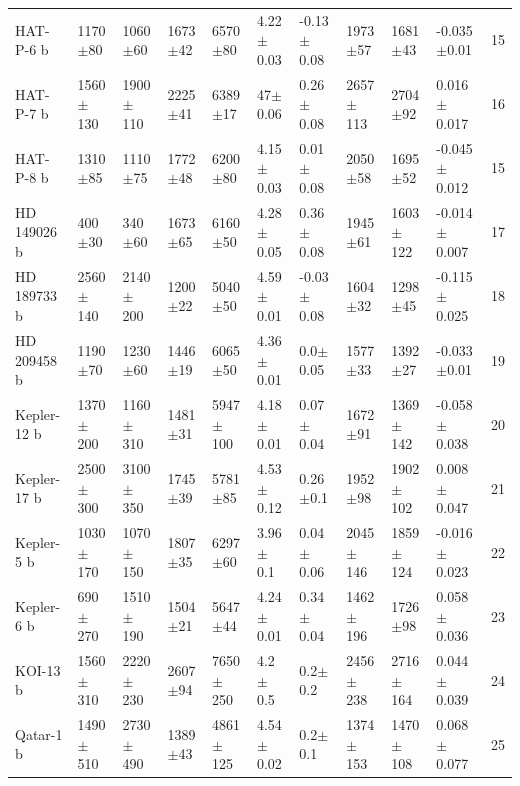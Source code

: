\begin{subappendices}
{\begin{landscape}
\begin{longtable}{lllllllllll}
HAT-P-6 b   &     1170$\pm$80 &     1060$\pm$60 &   1673$\pm$42 &    6570$\pm$80 &  4.22$\pm$0.03 &  -0.13$\pm$0.08 &        1973$\pm$57 &        1681$\pm$43 &   -0.035$\pm$0.01 &        15 \\
HAT-P-7 b   &    1560$\pm$130 &    1900$\pm$110 &   2225$\pm$41 &    6389$\pm$17 &  47$\pm$0.06 &   0.26$\pm$0.08 &       2657$\pm$113 &        2704$\pm$92 &   0.016$\pm$0.017 &   16 \\
HAT-P-8 b   &     1310$\pm$85 &     1110$\pm$75 &   1772$\pm$48 &    6200$\pm$80 &  4.15$\pm$0.03 &   0.01$\pm$0.08 &        2050$\pm$58 &        1695$\pm$52 &  -0.045$\pm$0.012 &        15 \\
HD 149026 b &      400$\pm$30 &      340$\pm$60 &   1673$\pm$65 &    6160$\pm$50 &  4.28$\pm$0.05 &   0.36$\pm$0.08 &        1945$\pm$61 &       1603$\pm$122 &  -0.014$\pm$0.007 &      17 \\
HD 189733 b &    2560$\pm$140 &    2140$\pm$200 &   1200$\pm$22 &    5040$\pm$50 &  4.59$\pm$0.01 &  -0.03$\pm$0.08 &        1604$\pm$32 &        1298$\pm$45 &  -0.115$\pm$0.025 &    18 \\
HD 209458 b &     1190$\pm$70 &     1230$\pm$60 &   1446$\pm$19 &    6065$\pm$50 &  4.36$\pm$0.01 &    0.0$\pm$0.05 &        1577$\pm$33 &        1392$\pm$27 &   -0.033$\pm$0.01 &   19 \\
Kepler-12 b &    1370$\pm$200 &    1160$\pm$310 &   1481$\pm$31 &   5947$\pm$100 &  4.18$\pm$0.01 &   0.07$\pm$0.04 &        1672$\pm$91 &       1369$\pm$142 &  -0.058$\pm$0.038 &        20 \\
Kepler-17 b &    2500$\pm$300 &    3100$\pm$350 &   1745$\pm$39 &    5781$\pm$85 &  4.53$\pm$0.12 &    0.26$\pm$0.1 &        1952$\pm$98 &       1902$\pm$102 &   0.008$\pm$0.047 &        21 \\
Kepler-5 b  &    1030$\pm$170 &    1070$\pm$150 &   1807$\pm$35 &    6297$\pm$60 &   3.96$\pm$0.1 &   0.04$\pm$0.06 &       2045$\pm$146 &       1859$\pm$124 &  -0.016$\pm$0.023 &        22 \\
Kepler-6 b  &     690$\pm$270 &    1510$\pm$190 &   1504$\pm$21 &    5647$\pm$44 &  4.24$\pm$0.01 &   0.34$\pm$0.04 &       1462$\pm$196 &        1726$\pm$98 &   0.058$\pm$0.036 &         23 \\
KOI-13 b    &    1560$\pm$310 &    2220$\pm$230 &   2607$\pm$94 &   7650$\pm$250 &    4.2$\pm$0.5 &     0.2$\pm$0.2 &       2456$\pm$238 &       2716$\pm$164 &   0.044$\pm$0.039 &        24 \\
Qatar-1 b   &    1490$\pm$510 &    2730$\pm$490 &   1389$\pm$43 &   4861$\pm$125 &  4.54$\pm$0.02 &     0.2$\pm$0.1 &       1374$\pm$153 &       1470$\pm$108 &   0.068$\pm$0.077 &        25 \\

\end{longtable}
\end{landscape}}
\end{subappendices}
